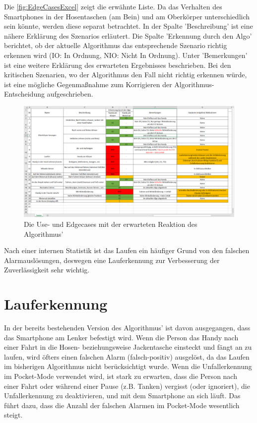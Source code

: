 Die \autoref{fig:EdgeCasesExcel} zeigt die erwähnte Liste. Da das Verhalten des Smartphones in der Hosentaschen (am Bein) und am Oberkörper unterschiedlich sein könnte, werden diese separat betrachtet. In der Spalte 'Beschreibung' ist eine nähere Erklärung des Szenarios erläutert. Die Spalte 'Erkennung durch den Algo' berichtet, ob der aktuelle Algorithmus das entsprechende Szenario richtig erkennen wird (IO: In Ordnung, NIO: Nicht In Ordnung). Unter 'Bemerkungen' ist eine weitere Erklärung des erwarteten Ergebnisses beschrieben. Bei den kritischen Szenarien, wo der Algorithmus den Fall nicht richtig erkennen würde, ist eine mögliche Gegenmaßnahme zum Korrigieren der Algorithmus-Entscheidung aufgeschrieben.
\begin{figure}[H]%
	\centering
	\includegraphics[width=\linewidth]{Bilder/EdgeCasesExcel.png}
	\caption{Die Use- und Edgecases mit der erwarteten Reaktion des Algorithmus'}
	\label{fig:EdgeCasesExcel}
\end{figure}

Nach einer internen Statistik ist das Laufen ein häufiger Grund von den falschen Alarmauslösungen, deswegen eine Lauferkennung zur Verbesserung der Zuverlässigkeit sehr wichtig.

\section{Lauferkennung} \label{sec:Lauferkennung}
In der bereits bestehenden Version des Algorithmus' ist davon ausgegangen, dass das Smartphone am Lenker befestigt wird. Wenn die Person das Handy nach einer Fahrt in die Hosen- beziehungsweise Jackentasche einsteckt und fängt an zu laufen, wird öfters einen falschen Alarm (falsch-positiv) ausgelöst, da das Laufen im bisherigen Algorithmus nicht berücksichtigt wurde.
Wenn die Unfallerkennung im Pocket-Mode verwendet wird, ist stark zu erwarten, dass die Person nach einer Fahrt oder während einer Pause (z.B. Tanken) vergisst (oder ignoriert), die Unfallerkennung zu deaktivieren, und mit dem Smartphone an sich läuft. Das führt dazu, dass die Anzahl der falschen Alarmen im Pocket-Mode wesentlich steigt.

